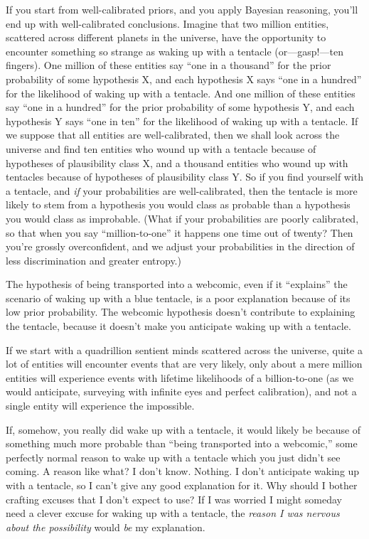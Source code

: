 {
 If you start from well-calibrated priors, and you apply Bayesian
reasoning, you'll end up with well-calibrated
conclusions. Imagine that two million entities, scattered across
different planets in the universe, have the opportunity to encounter
something so strange as waking up with a tentacle (or---gasp!---ten
fingers). One million of these entities say ``one in a
thousand'' for the prior probability of some
hypothesis X, and each hypothesis X says ``one in a
hundred'' for the likelihood of waking up with a
tentacle. And one million of these entities say ``one
in a hundred'' for the prior probability of some
hypothesis Y, and each hypothesis Y says ``one in
ten'' for the likelihood of waking up with a
tentacle. If we suppose that all entities are well-calibrated, then we
shall look across the universe and find ten entities who wound up with
a tentacle because of hypotheses of plausibility class X, and a
thousand entities who wound up with tentacles because of hypotheses of
plausibility class Y. So if you find yourself with a tentacle, and
\textit{if} your probabilities are well-calibrated, then the tentacle
is more likely to stem from a hypothesis you would class as probable
than a hypothesis you would class as improbable. (What if your
probabilities are poorly calibrated, so that when you say
``million-to-one'' it happens one
time out of twenty? Then you're grossly overconfident,
and we adjust your probabilities in the direction of less
discrimination and greater entropy.)}

{
 The hypothesis of being transported into a webcomic, even if it
``explains'' the scenario of waking
up with a blue tentacle, is a poor explanation because of its low prior
probability. The webcomic hypothesis doesn't contribute
to explaining the tentacle, because it doesn't make you
anticipate waking up with a tentacle.}

{
 If we start with a quadrillion sentient minds scattered across the
universe, quite a lot of entities will encounter events that are very
likely, only about a mere million entities will experience events with
lifetime likelihoods of a billion-to-one (as we would anticipate,
surveying with infinite eyes and perfect calibration), and not a single
entity will experience the impossible.}

{
 If, somehow, you really did wake up with a tentacle, it would
likely be because of something much more probable than
``being transported into a
webcomic,'' some perfectly normal reason to wake up
with a tentacle which you just didn't see coming. A
reason like what? I don't know. Nothing. I
don't anticipate waking up with a tentacle, so I
can't give any good explanation for it. Why should I
bother crafting excuses that I don't expect to use? If
I was worried I might someday need a clever excuse for waking up with a
tentacle, the \textit{reason I was nervous about the possibility} would
\textit{be} my explanation.}

